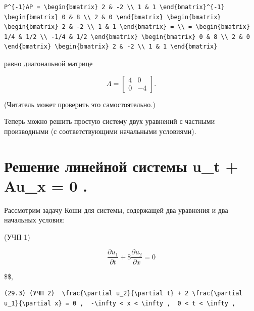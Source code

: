 \documentclass[
  ukrainian,
]{article}
\begin{document}
\begin{verbatim}
P^{-1}AP = \begin{bmatrix} 2 & -2 \\ 1 & 1 \end{bmatrix}^{-1} \begin{bmatrix} 0 & 8 \\ 2 & 0 \end{bmatrix} \begin{bmatrix} \begin{bmatrix} 2 & -2 \\ 1 & 1 \end{bmatrix} = \\ = \begin{bmatrix} 1/4 & 1/2 \\ -1/4 & 1/2 \end{bmatrix} \begin{bmatrix} 0 & 8 \\ 2 & 0 \end{bmatrix} \begin{bmatrix} 2 & -2 \\ 1 & 1 \end{bmatrix}
\end{verbatim}

равно диагональной матрице

\[
\Lambda = \begin{bmatrix} 4 & 0 \\ 0 & -4 \end{bmatrix}.
\]

(Читатель может проверить это самостоятельно.)

Теперь можно решить простую систему двух уравнений с частными
производными (с соответствующими начальными условиями).

\section{Решение линейной системы u\_t + Au\_x = 0
.}\label{ux440ux435ux448ux435ux43dux438ux435-ux43bux438ux43dux435ux439ux43dux43eux439-ux441ux438ux441ux442ux435ux43cux44b-u_t-au_x-0-.}

Рассмотрим задачу Коши для системы, содержащей два уравнения и два
начальных условия:

(УЧП 1)

\[
\frac{\partial u_1}{\partial t} + 8 \frac{\partial u_2}{\partial x} = 0
\]

\$\$,

\begin{verbatim}
(29.3) (УЧП 2)  \frac{\partial u_2}{\partial t} + 2 \frac{\partial u_1}{\partial x} = 0 ,  -\infty < x < \infty ,  0 < t < \infty ,
\end{verbatim}
\end{document}
